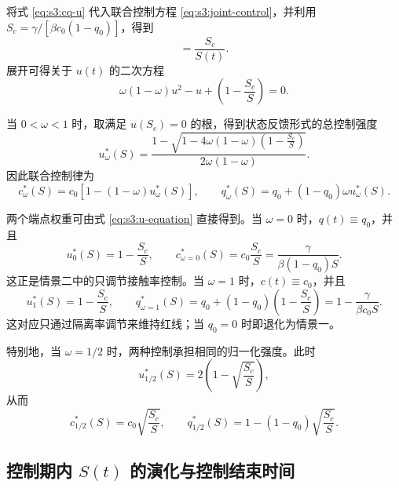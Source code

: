 将式 \eqref{eq:s3:cq-u} 代入联合控制方程 \eqref{eq:s3:joint-control}，并利用 $S_c=\gamma/[\beta c_0(1-q_0)]$，得到
\begin{equation}
[1-(1-\omega)u(t)][1-\omega u(t)]
=
\frac{S_c}{S(t)}.
\label{eq:s3:u-equation}
\end{equation}
展开可得关于 $u(t)$ 的二次方程
\begin{equation}
\omega(1-\omega)u^2-u+
\left(1-\frac{S_c}{S}\right)=0.
\label{eq:s3:u-quadratic}
\end{equation}

当 $0<\omega<1$ 时，取满足 $u(S_c)=0$ 的根，得到状态反馈形式的总控制强度
\begin{equation}
u_\omega^*(S)
=
\frac{
1-\sqrt{
1-4\omega(1-\omega)\left(1-\frac{S_c}{S}\right)
}
}
{2\omega(1-\omega)}.
\label{eq:s3:u-feedback}
\end{equation}
因此联合控制律为
\begin{equation}
c_\omega^*(S)
=
c_0[1-(1-\omega)u_\omega^*(S)],
\qquad
q_\omega^*(S)
=
q_0+(1-q_0)\omega u_\omega^*(S).
\label{eq:s3:joint-feedback}
\end{equation}

两个端点权重可由式 \eqref{eq:s3:u-equation} 直接得到。当 $\omega=0$ 时，$q(t)\equiv q_0$，并且
\begin{equation}
u_0^*(S)=1-\frac{S_c}{S},
\qquad
c_{\omega=0}^*(S)=c_0\frac{S_c}{S}
=\frac{\gamma}{\beta(1-q_0)S}.
\end{equation}
这正是情景二中的只调节接触率控制。当 $\omega=1$ 时，$c(t)\equiv c_0$，并且
\begin{equation}
u_1^*(S)=1-\frac{S_c}{S},
\qquad
q_{\omega=1}^*(S)=q_0+(1-q_0)\left(1-\frac{S_c}{S}\right)
=1-\frac{\gamma}{\beta c_0S}.
\end{equation}
这对应只通过隔离率调节来维持红线；当 $q_0=0$ 时即退化为情景一。

特别地，当 $\omega=1/2$ 时，两种控制承担相同的归一化强度。此时
\begin{equation}
u_{1/2}^*(S)=2\left(1-\sqrt{\frac{S_c}{S}}\right),
\end{equation}
从而
\begin{equation}
c_{1/2}^*(S)=c_0\sqrt{\frac{S_c}{S}},
\qquad
q_{1/2}^*(S)=1-(1-q_0)\sqrt{\frac{S_c}{S}}.
\label{eq:s3:equal-weight}
\end{equation}

\subsection{控制期内 $S(t)$ 的演化与控制结束时间}

